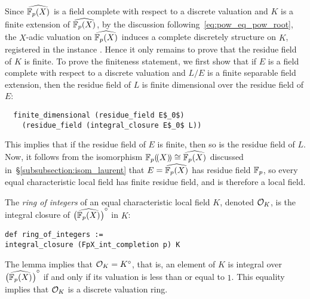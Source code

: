 \documentclass[sigplan,10pt, nonacm, review]{acmart}
\begin{document}
Since $\FpXCompl$ is a field complete with respect to a discrete valuation and $K$ is a finite extension of $\FpXCompl$, by the discussion following~\eqref{eq:pow_eq_pow_root}, the $X$-adic valuation on $\FpXCompl$ induces a complete\href{https://github.com/LCFT-Lean/local_fields/blob/76ad487d09babdb0018f394a5634526637ee014a/src/eq_characteristic/valuation.lean#L52}{\extlink} discretely\href{https://github.com/LCFT-Lean/local_fields/blob/76ad487d09babdb0018f394a5634526637ee014a/src/eq_characteristic/valuation.lean#L55}{\extlink}  structure on $K$, registered in the instance \href{https://github.com/LCFT-Lean/local_fields/blob/76ad487d09babdb0018f394a5634526637ee014a/src/eq_characteristic/valuation.lean#L49}{\extlink}. Hence it only remains to prove that the residue field of $K$ is finite. To prove the finiteness statement, we first show that if $E$ is a field complete with respect to a discrete valuation and $L/E$ is a finite separable field extension, then the residue field of $L$ is finite dimensional over the residue field of $E$\href{https://github.com/LCFT-Lean/local_fields/blob/76ad487d09babdb0018f394a5634526637ee014a/src/discrete_valuation_ring/residue_field.lean#L373}{\extlink}:
\begin{lstlisting}
  finite_dimensional (residue_field E$_0$) 
    (residue_field (integral_closure E$_0$ L))
\end{lstlisting}
This implies that if the residue field of $E$ is finite, then so is the residue field of $L$. Now, it follows from the isomorphism $\laurentseries\cong\FpXCompl$ discussed in~\S\ref{subsubsection:isom_laurent} that $E=\FpXCompl$ has residue field $\mathbb{F}_{p}$, so every equal characteristic local field has finite residue field, and is therefore a local field.

The \emph{ring of integers} of an equal characteristic local field $K$, denoted $\mathcal{O}_{K}$, is the integral closure of $\FpXComplInt$ in $K$\href{https://github.com/LCFT-Lean/local_fields/blob/76ad487d09babdb0018f394a5634526637ee014a/src/eq_characteristic/basic.lean#L370}{\extlink}:
\begin{lstlisting}
def ring_of_integers := 
integral_closure (FpX_int_completion p) K
\end{lstlisting}
The lemma  implies that $\mathcal{O}_{K} = {K}^\circ$, that is, an element of $K$ is integral over $\FpXComplInt$ if and only if its valuation is less than or equal to $1$. This equality implies that $\mathcal{O}_{K}$ is a discrete valuation ring\href{https://github.com/LCFT-Lean/local_fields/blob/76ad487d09babdb0018f394a5634526637ee014a/src/eq_characteristic/valuation.lean#L59}{\extlink}.
\end{document}
